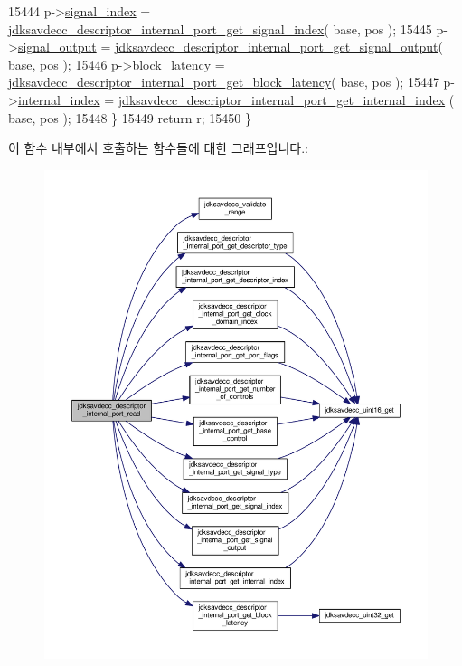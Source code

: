 \begin{DoxyCode}
15444         p->\hyperlink{structjdksavdecc__descriptor__internal__port_ae2e81a95ee9ad83f1fe22b6a1ee29075}{signal\_index} = 
      \hyperlink{group__descriptor__internal__port_ga12f6a3263de953390c8fd0bcd4d6c951}{jdksavdecc\_descriptor\_internal\_port\_get\_signal\_index}( 
      base, pos );
15445         p->\hyperlink{structjdksavdecc__descriptor__internal__port_ab4b91864e6fc335d7e86536d9f4461e4}{signal\_output} = 
      \hyperlink{group__descriptor__internal__port_ga8a1112b1d21e734475a457d5a3d65f50}{jdksavdecc\_descriptor\_internal\_port\_get\_signal\_output}(
       base, pos );
15446         p->\hyperlink{structjdksavdecc__descriptor__internal__port_ae2e9f0088d5e900b610d1b2818dfc559}{block\_latency} = 
      \hyperlink{group__descriptor__internal__port_gaa85d65e354a30fab5fe1d7fe022cc920}{jdksavdecc\_descriptor\_internal\_port\_get\_block\_latency}(
       base, pos );
15447         p->\hyperlink{structjdksavdecc__descriptor__internal__port_a56a4632be255e3d3028e9978461c8ff4}{internal\_index} = 
      \hyperlink{group__descriptor__internal__port_ga0bfe9aa8ec57df686f5efdd7bc11ad9b}{jdksavdecc\_descriptor\_internal\_port\_get\_internal\_index}
      ( base, pos );
15448     \}
15449     \textcolor{keywordflow}{return} r;
15450 \}
\end{DoxyCode}


이 함수 내부에서 호출하는 함수들에 대한 그래프입니다.\+:
\nopagebreak
\begin{figure}[H]
\begin{center}
\leavevmode
\includegraphics[width=350pt]{group__descriptor__internal__port_ga36d743e0bc1ee224ca567ceddae4d35c_cgraph}
\end{center}
\end{figure}


